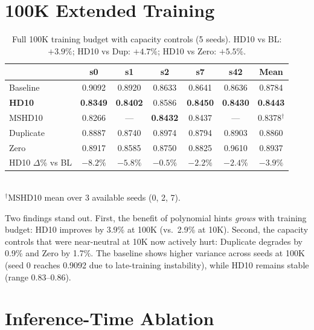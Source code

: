 \documentclass{article}
\begin{document}
\section{100K Extended Training}
\label{app:100k}

\begin{table}[h]
\centering
\caption{Full 100K training budget with capacity controls (5 seeds). HD10 vs BL: $+3.9\%$; HD10 vs Dup: $+4.7\%$; HD10 vs Zero: $+5.5\%$.}
\small
\begin{tabular}{lcccccc}
\toprule
& \textbf{s0} & \textbf{s1} & \textbf{s2} & \textbf{s7} & \textbf{s42} & \textbf{Mean} \\
\midrule
Baseline & 0.9092 & 0.8920 & 0.8633 & 0.8641 & 0.8636 & 0.8784 \\
\textbf{HD10} & \textbf{0.8349} & \textbf{0.8402} & 0.8586 & \textbf{0.8450} & \textbf{0.8430} & \textbf{0.8443} \\
MSHD10 & 0.8266 & --- & \textbf{0.8432} & 0.8437 & --- & 0.8378$^\dagger$ \\
Duplicate & 0.8887 & 0.8740 & 0.8974 & 0.8794 & 0.8903 & 0.8860 \\
Zero & 0.8917 & 0.8585 & 0.8750 & 0.8825 & 0.9610 & 0.8937 \\
\midrule
HD10 $\Delta$\% vs BL & $-8.2\%$ & $-5.8\%$ & $-0.5\%$ & $-2.2\%$ & $-2.4\%$ & $-3.9\%$ \\
\bottomrule
\end{tabular}
\\[2pt]
{\footnotesize $^\dagger$MSHD10 mean over 3 available seeds (0, 2, 7).}
\end{table}

Two findings stand out. First, the benefit of polynomial hints \emph{grows} with training budget: HD10 improves by 3.9\% at 100K (vs.\ 2.9\% at 10K). Second, the capacity controls that were near-neutral at 10K now actively hurt: Duplicate degrades by 0.9\% and Zero by 1.7\%. The baseline shows higher variance across seeds at 100K (seed 0 reaches 0.9092 due to late-training instability), while HD10 remains stable (range 0.83--0.86).

\section{Inference-Time Ablation}
\label{app:inference}
\end{document}
